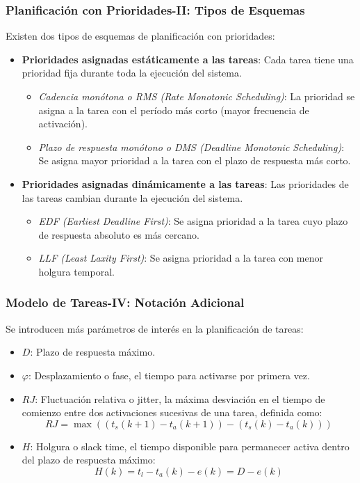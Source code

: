 \documentclass[a4paper,12pt]{article}
\begin{document}
\subsubsection{Planificación con Prioridades-II: Tipos de Esquemas}

Existen dos tipos de esquemas de planificación con prioridades:

\begin{itemize}
    \item \textbf{Prioridades asignadas estáticamente a las tareas}: Cada tarea tiene una prioridad fija durante toda la ejecución del sistema.
    \begin{itemize}
        \item \textit{Cadencia monótona o RMS (Rate Monotonic Scheduling)}: La prioridad se asigna a la tarea con el período más corto (mayor frecuencia de activación).
        \item \textit{Plazo de respuesta monótono o DMS (Deadline Monotonic Scheduling)}: Se asigna mayor prioridad a la tarea con el plazo de respuesta más corto.
    \end{itemize}
    \item \textbf{Prioridades asignadas dinámicamente a las tareas}: Las prioridades de las tareas cambian durante la ejecución del sistema.
    \begin{itemize}
        \item \textit{EDF (Earliest Deadline First)}: Se asigna prioridad a la tarea cuyo plazo de respuesta absoluto es más cercano.
        \item \textit{LLF (Least Laxity First)}: Se asigna prioridad a la tarea con menor holgura temporal.
    \end{itemize}
\end{itemize}

\subsubsection{Modelo de Tareas-IV: Notación Adicional}

Se introducen más parámetros de interés en la planificación de tareas:

\begin{itemize}
    \item \(D\): Plazo de respuesta máximo.
    \item \(\varphi\): Desplazamiento o fase, el tiempo para activarse por primera vez.
    \item \(RJ\): Fluctuación relativa o jitter, la máxima desviación en el tiempo de comienzo entre dos activaciones sucesivas de una tarea, definida como:
    \[
    RJ = \max((t_s(k+1) - t_a(k+1)) - (t_s(k) - t_a(k)))
    \]
    \item \(H\): Holgura o slack time, el tiempo disponible para permanecer activa dentro del plazo de respuesta máximo:
    \[
    H(k) = t_l - t_a(k) - e(k) = D - e(k)
    \]
\end{itemize}
\end{document}
